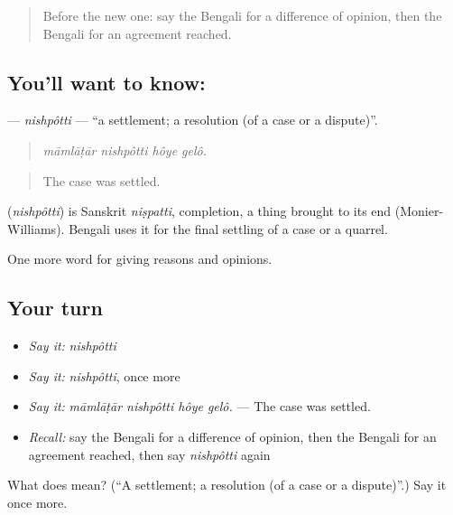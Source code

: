 \begin{quote}
Before the new one: say the Bengali for a difference of opinion, then the Bengali for an agreement reached.
\end{quote}

\subsection*{You'll want to know: }
\textbf{} — \emph{nishpôtti} — \textquotedblleft{}a settlement; a resolution (of a case or a dispute)\textquotedblright{}.

\begin{quote}
   
\end{quote}

\begin{quote}
\emph{māmlāṭār nishpôtti hôye gelô.}
\end{quote}

\begin{quote}
The case was settled.
\end{quote}

\begin{cousinweb}
\textbf{} (\emph{nishpôtti}) is Sanskrit \emph{niṣpatti}, completion, a thing brought to its end (Monier-Williams). Bengali uses it for the final settling of a case or a quarrel.
\end{cousinweb}

\begin{grammarlens}[title={What you've built}]
One more word for giving reasons and opinions.
\end{grammarlens}

\subsection*{Your turn}
\begin{itemize}
\raggedright
  \item \emph{Say it:} \emph{nishpôtti}
  \item \emph{Say it:} \emph{nishpôtti}, once more
  \item \emph{Say it:} \emph{māmlāṭār nishpôtti hôye gelô.} — The case was settled.
  \item \emph{Recall:} say the Bengali for a difference of opinion, then the Bengali for an agreement reached, then say \emph{nishpôtti} again
\end{itemize}

\begin{tcolorbox}[breakable,colback=teal!4,colframe=teal!35!black,title={Before you move on}]
What does  mean? (\textquotedblleft{}A settlement; a resolution (of a case or a dispute)\textquotedblright{}.) Say it once more.
\end{tcolorbox}
